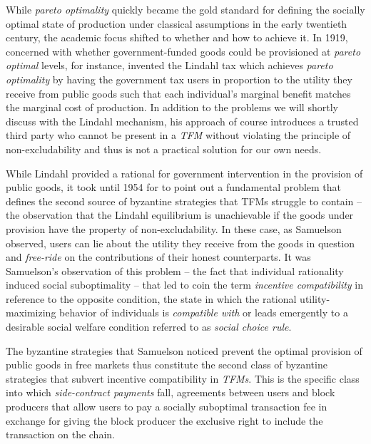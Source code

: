 \documentclass[sigconf,anonymous]{aamas}
\begin{document}
While \textit{pareto optimality} quickly became the gold standard for defining the socially optimal state of production under classical assumptions in the early twentieth century, the academic focus shifted to whether and how to achieve it. In 1919, concerned with whether government-funded goods could be provisioned at \textit{pareto optimal} levels, for instance, \citet{lindahl1919gerechtigkeit} invented the Lindahl tax which achieves  \textit{pareto optimality} by having the government tax users in proportion to the utility they receive from public goods such that each individual’s marginal benefit matches the marginal cost of production. In addition to the problems we will shortly discuss with the Lindahl mechanism, his approach of course introduces a trusted third party who cannot be present in a \textit{TFM} without violating the principle of non-excludability and thus is not a practical solution for our own needs.

While Lindahl provided a rational for government intervention in the provision of public goods, it took until 1954 for \citet{samuelson1954pure} to point out a fundamental problem that defines the second source of byzantine strategies that TFMs struggle to contain -- the observation that the Lindahl equilibrium is unachievable if the goods under provision have the property of non-excludability. In these case, as Samuelson observed, users can lie about the utility they receive from the goods in question and \textit{free-ride} on the contributions of their honest counterparts. It was Samuelson's observation of this problem -- the fact that individual rationality induced social suboptimality -- that led \citet{hurwicz1960optimality} to coin the term \textit{incentive compatibility} in reference to the opposite condition, the state in which the rational utility-maximizing behavior of individuals is \textit{compatible with} or leads emergently to a desirable social welfare condition referred to as \textit{social choice rule}.

The byzantine strategies that Samuelson noticed prevent the optimal provision of public goods in free markets thus constitute the second class of byzantine strategies that subvert incentive compatibility in \textit{TFMs}. This is the specific class into which \textit{side-contract payments} fall, agreements between users and block producers that allow users to pay a socially suboptimal transaction fee in exchange for giving the block producer the exclusive right to include the transaction on the chain.
\end{document}
